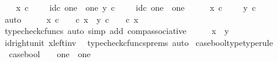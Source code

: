 \begin{isabellebody}
\ \ \isamarkupfalse%
\ {\isachardoublequoteopen}x\ {\isasymcirc}\isactrlsub c\ {\isasymt}\ {\isasymamalg}\ {\isasymf}\ {\isacharequal}{\kern0pt}\ id\isactrlsub c\ {\isacharparenleft}{\kern0pt}one\ {\isasymCoprod}\ one{\isacharparenright}{\kern0pt}{\isachardoublequoteclose}\ {\isachardoublequoteopen}y\ {\isasymcirc}\isactrlsub c\ {\isasymt}\ {\isasymamalg}\ {\isasymf}\ {\isacharequal}{\kern0pt}\ id\isactrlsub c\ {\isacharparenleft}{\kern0pt}one\ {\isasymCoprod}\ one{\isacharparenright}{\kern0pt}{\isachardoublequoteclose}\isanewline
\ \ \isamarkupfalse%
\ \isamarkupfalse%
\ {\isachardoublequoteopen}x\ {\isasymcirc}\isactrlsub c\ {\isasymt}\ {\isasymamalg}\ {\isasymf}\ {\isacharequal}{\kern0pt}\ y\ {\isasymcirc}\isactrlsub c\ {\isasymt}\ {\isasymamalg}\ {\isasymf}{\isachardoublequoteclose}\isanewline
\ \ \ \ \isamarkupfalse%
\ auto\isanewline
\ \ \isamarkupfalse%
\ \isamarkupfalse%
\ {\isachardoublequoteopen}x\ {\isasymcirc}\isactrlsub c\ {\isasymt}\ {\isasymamalg}\ {\isasymf}\ {\isasymcirc}\isactrlsub c\ x\ {\isacharequal}{\kern0pt}\ y\ {\isasymcirc}\isactrlsub c\ {\isasymt}\ {\isasymamalg}\ {\isasymf}\ {\isasymcirc}\isactrlsub c\ x{\isachardoublequoteclose}\isanewline
\ \ \ \ \isamarkupfalse%
\ {\isacharparenleft}{\kern0pt}typecheck{\isacharunderscore}{\kern0pt}cfuncs{\isacharcomma}{\kern0pt}\ auto\ simp\ add{\isacharcolon}{\kern0pt}\ comp{\isacharunderscore}{\kern0pt}associative{}{\isacharparenright}{\kern0pt}\isanewline
\ \ \isamarkupfalse%
\ \isamarkupfalse%
\ {\isachardoublequoteopen}x\ {\isacharequal}{\kern0pt}\ y{\isachardoublequoteclose}\isanewline
\ \ \ \ \isamarkupfalse%
\ id{\isacharunderscore}{\kern0pt}right{\isacharunderscore}{\kern0pt}unit{}\ x{\isacharunderscore}{\kern0pt}left{\isacharunderscore}{\kern0pt}inv\ \isamarkupfalse%
\ {\isacharparenleft}{\kern0pt}typecheck{\isacharunderscore}{\kern0pt}cfuncs{\isacharunderscore}{\kern0pt}prems{\isacharcomma}{\kern0pt}\ auto{\isacharparenright}{\kern0pt}\isanewline
{}\isamarkupfalse%
%
\endisatagproof
{\isafoldproof}%
%
\isadelimproof
\isanewline
%
\endisadelimproof
\isanewline
{}\isamarkupfalse%
\ case{\isacharunderscore}{\kern0pt}bool{\isacharunderscore}{\kern0pt}type{\isacharbrackleft}{\kern0pt}type{\isacharunderscore}{\kern0pt}rule{\isacharbrackright}{\kern0pt}{\isacharcolon}{\kern0pt}\ \isanewline
\ \ {\isachardoublequoteopen}case{\isacharunderscore}{\kern0pt}bool\ {\isacharcolon}{\kern0pt}\ {\isasymOmega}\ {\isasymrightarrow}\ one\ {\isasymCoprod}\ one{\isachardoublequoteclose}\isanewline

\end{isabellebody}
